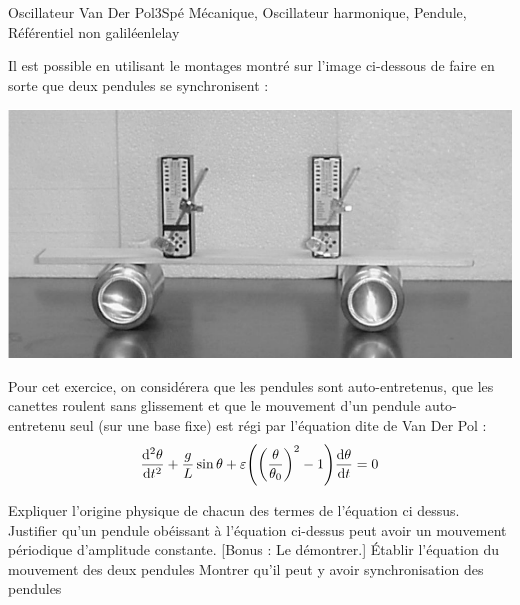 
\begin{exercise}{Oscillateur Van Der Pol}{3}{Spé}
{Mécanique, Oscillateur harmonique, Pendule, Référentiel non galiléen}{lelay}

Il est possible en utilisant le montages montré sur l'image ci-dessous de faire en sorte que deux pendules se synchronisent : 

{\centering
    \includegraphics[scale=0.3]{meca/mecapoint/vanderpol.png}\par
}

Pour cet exercice, on considérera que les pendules sont auto-entretenus, que les canettes roulent sans glissement et que le mouvement d'un pendule auto-entretenu seul (sur une base fixe) est régi par l'équation dite de Van Der Pol : 
\begin{align*}
\frac{\dd^2 \theta}{\dd t^2} + \frac{g}L\sin\theta + \varepsilon\qty(\qty(\frac\theta{\theta_0})^2-1)\frac{\dd \theta}{\dd t}=0
\end{align*}

\begin{questions}
    \question Expliquer l'origine physique de chacun des termes de l'équation ci dessus.
    \question Justifier qu'un pendule obéissant à l'équation ci-dessus peut avoir un mouvement périodique d'amplitude constante. [Bonus : Le démontrer.]
	\question Établir l'équation du mouvement des deux pendules 
	\question Montrer qu'il peut y avoir synchronisation des pendules
\end{questions}
\end{exercise}